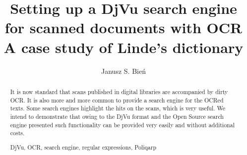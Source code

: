 \documentclass[runningheads,a4paper]{llncs}
\newcommand{\keywords}[1]{\par\addvspace\baselineskip
\noindent\keywordname\enspace\ignorespaces#1}
\begin{document}
\mainmatter  %

\title{Setting up a DjVu search engine\\ for scanned documents with OCR\\A case study of Linde's dictionary}


%
%
\author{Janusz S. Bień}
%


%
%

\maketitle


\begin{abstract}
  It is now standard that scans published in digital libraries are
  accompanied by dirty OCR.  It is also more and more common to
  provide a search engine for the OCRed texts. Some search engines
  highlight the hits on the scans, which is very useful. We intend to
  demonstrate that owing to the DjVu format and the Open Source
  search engine presented such functionality can be provided very
  easily and without additional costs.  \keywords{DjVu, OCR, search
    engine, regular expressions, Poliqarp}
\end{abstract}
\end{document}
